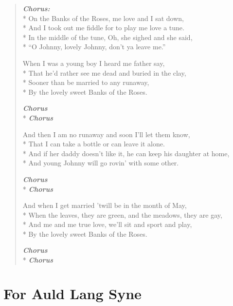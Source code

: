 \documentclass[9pt,twoside]{extarticle}
\makeatletter
\newenvironment{xverse}{
	\begin{verse}
	\fontsize{8.5}{10.5}\selectfont
}{
	\end{verse}
}
\newcommand{\chorusdef}{\textbf{\emph{Chorus:}}\\*}
\newcommand{\chorus@mark}[1][1]{%
\textbf{\emph{Chorus \ifthenelse{\equal{#1}{1}}{}{$\times$ #1}}}%
}
\newcommand{\chorusmark}[1][1]{%
\ifvmode%
\vspace{-0.5\stanzaskip}%
\chorus@mark[#1]%
\vspace{-0.5\stanzaskip}%
\else \\*%
\chorus@mark[#1]%
\fi%
}
\makeatother
\begin{document}
\begin{xverse}
\chorusdef
On the Banks of the Roses, me love and I sat down, \\*
And I took out me fiddle for to play me love a tune. \\*
In the middle of the tune, Oh, she sighed and she said, \\*
“O Johnny, lovely Johnny, don’t ya leave me.”

When I was a young boy I heard me father say, \\*
That he’d rather see me dead and buried in the clay, \\*
Sooner than be married to any runaway, \\*
By the lovely sweet Banks of the Roses.

\chorusmark

And then I am no runaway and soon I’ll let them know, \\*
That I can take a bottle or can leave it alone. \\*
And if her daddy doesn’t like it, he can keep his daughter at home, \\*
And young Johnny will go rovin’ with some other.

\chorusmark

And when I get married ’twill be in the month of May, \\*
When the leaves, they are green, and the meadows, they are gay, \\*
And me and me true love, we’ll sit and sport and play, \\*
By the lovely sweet Banks of the Roses.

\chorusmark
\end{xverse}

\section{For Auld Lang Syne}
\end{document}
